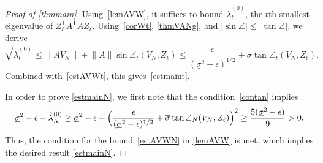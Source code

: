 \documentclass{siamart190516}
\newcommand{\Ttran}{\mathsf{T}}
\providecommand{\abs}[1]{\lvert#1\rvert}
\providecommand{\norm}[1]{\lVert#1\rVert}
\begin{document}
\begin{proof}[Proof of \cref{thmmain}]
    Using~\cref{lemAVW}, it suffices to bound $\tilde{\lambda}_t^{(0)}$, the $t$th smallest eigenvalue of $Z_{\ell}^{\Ttran}A^{\Ttran}AZ_{\ell}$. Using~\cref{corWt}, 
    \cref{thmVANg}, and $\abs{\sin\angle}\leq \abs{\tan\angle}$, we derive 
\[
    \sqrt{\tilde \lambda_t^{(0)}} \leq \norm{AV_{N}}+\norm{A}\sin\angle_{t}(V_{N},Z_{\ell})\leq \frac{\epsilon}{(\underline{\sigma}^{2}-\epsilon)^{1/2}}+\overline{\sigma}\tan\angle_{t}(V_{N},Z_{\ell}).  
\]
Combined with~\cref{estAVWt}, this gives~\cref{estmaint}.

In order to prove \cref{estmainN}, we first note that the condition~\cref{contan} implies
\begin{equation*}
    \underline{\sigma}^{2}-\epsilon-\tilde \lambda_N^{(0)}
    \geq \underline{\sigma}^{2}-\epsilon-\Bigl(\frac{\epsilon}{(\underline{\sigma}^{2}-\epsilon)^{1/2}}+\overline{\sigma}\tan\angle_{N}(V_{N},Z_{\ell})\Bigr)^{2}\geq \frac{5(\underline{\sigma}^{2}-\epsilon)}{9}>0.
\end{equation*}
Thus, the condition for the bound~\cref{estAVWN} in \cref{lemAVW} is met, which implies the desired result \cref{estmainN}.
\end{proof}
\end{document}
